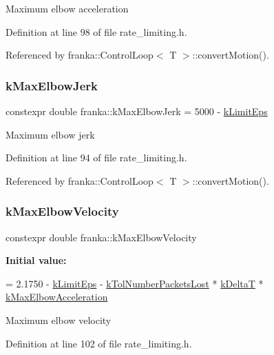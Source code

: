 Maximum elbow acceleration 

Definition at line 98 of file rate\+\_\+limiting.\+h.



Referenced by franka\+::\+Control\+Loop$<$ T $>$\+::convert\+Motion().

\mbox{\label{namespacefranka_adc70178204d4da073c78de777a2dff74}} 
\subsubsection{\texorpdfstring{k\+Max\+Elbow\+Jerk}{kMaxElbowJerk}}
{\footnotesize\ttfamily constexpr double franka\+::k\+Max\+Elbow\+Jerk = 5000 -\/ \hyperlink{namespacefranka_aad1f9b575274830b8da9e638559d424b}{k\+Limit\+Eps}}

Maximum elbow jerk 

Definition at line 94 of file rate\+\_\+limiting.\+h.



Referenced by franka\+::\+Control\+Loop$<$ T $>$\+::convert\+Motion().

\mbox{\label{namespacefranka_a2896b2e0c8bd96f9ee242c1203ac3483}} 
\subsubsection{\texorpdfstring{k\+Max\+Elbow\+Velocity}{kMaxElbowVelocity}}
{\footnotesize\ttfamily constexpr double franka\+::k\+Max\+Elbow\+Velocity}

{\bfseries Initial value\+:}
\begin{DoxyCode}
=
    2.1750 - \hyperlink{namespacefranka_aad1f9b575274830b8da9e638559d424b}{kLimitEps} - \hyperlink{namespacefranka_a664b546834ceecd4e3220ffa92f1172c}{kTolNumberPacketsLost} * 
      \hyperlink{namespacefranka_a1e207a0d5a6e90c1e1a78e6e1057120a}{kDeltaT} * \hyperlink{namespacefranka_af365e574ad7b1580ce15e30dd909b3ba}{kMaxElbowAcceleration}
\end{DoxyCode}
Maximum elbow velocity 

Definition at line 102 of file rate\+\_\+limiting.\+h.



